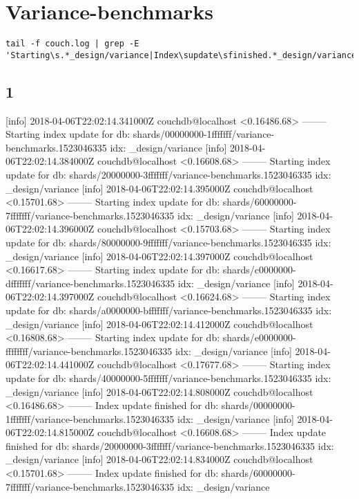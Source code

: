 \section{Variance-benchmarks}
\begin{verbatim}
tail -f couch.log | grep -E 'Starting\s.*_design/variance|Index\supdate\sfinished.*_design/variance';
\end{verbatim}

\subsection{1}
[info] 2018-04-06T22:02:14.341000Z couchdb@localhost <0.16486.68> -------- Starting index update for db: shards/00000000-1fffffff/variance-benchmarks.1523046335 idx: _design/variance
[info] 2018-04-06T22:02:14.384000Z couchdb@localhost <0.16608.68> -------- Starting index update for db: shards/20000000-3fffffff/variance-benchmarks.1523046335 idx: _design/variance
[info] 2018-04-06T22:02:14.395000Z couchdb@localhost <0.15701.68> -------- Starting index update for db: shards/60000000-7fffffff/variance-benchmarks.1523046335 idx: _design/variance
[info] 2018-04-06T22:02:14.396000Z couchdb@localhost <0.15703.68> -------- Starting index update for db: shards/80000000-9fffffff/variance-benchmarks.1523046335 idx: _design/variance
[info] 2018-04-06T22:02:14.397000Z couchdb@localhost <0.16617.68> -------- Starting index update for db: shards/c0000000-dfffffff/variance-benchmarks.1523046335 idx: _design/variance
[info] 2018-04-06T22:02:14.397000Z couchdb@localhost <0.16624.68> -------- Starting index update for db: shards/a0000000-bfffffff/variance-benchmarks.1523046335 idx: _design/variance
[info] 2018-04-06T22:02:14.412000Z couchdb@localhost <0.16808.68> -------- Starting index update for db: shards/e0000000-ffffffff/variance-benchmarks.1523046335 idx: _design/variance
[info] 2018-04-06T22:02:14.441000Z couchdb@localhost <0.17677.68> -------- Starting index update for db: shards/40000000-5fffffff/variance-benchmarks.1523046335 idx: _design/variance
[info] 2018-04-06T22:02:14.808000Z couchdb@localhost <0.16486.68> -------- Index update finished for db: shards/00000000-1fffffff/variance-benchmarks.1523046335 idx: _design/variance
[info] 2018-04-06T22:02:14.815000Z couchdb@localhost <0.16608.68> -------- Index update finished for db: shards/20000000-3fffffff/variance-benchmarks.1523046335 idx: _design/variance
[info] 2018-04-06T22:02:14.834000Z couchdb@localhost <0.15701.68> -------- Index update finished for db: shards/60000000-7fffffff/variance-benchmarks.1523046335 idx: _design/variance
